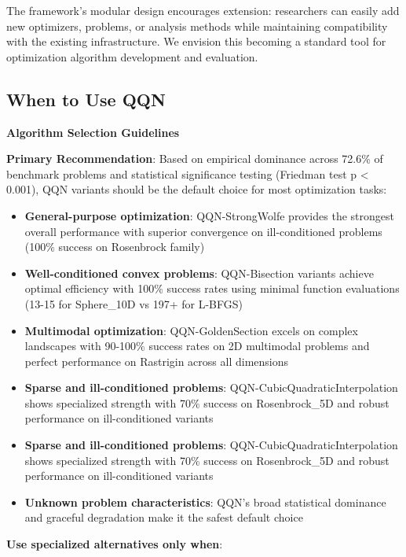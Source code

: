 The framework's modular design encourages extension: researchers can easily add new optimizers, problems, or analysis methods while maintaining compatibility with the existing infrastructure. We envision this becoming a standard tool for optimization algorithm development and evaluation.

\hypertarget{when-to-use-qqn}{%
\subsection{When to Use QQN}\label{when-to-use-qqn}}

\textbf{Algorithm Selection Guidelines}

\textbf{Primary Recommendation}: Based on empirical dominance across 72.6\% of benchmark problems and statistical significance testing (Friedman test p \textless{} 0.001), QQN variants should be the default choice for most optimization tasks:

\begin{itemize}
\tightlist
\item
  \textbf{General-purpose optimization}: QQN-StrongWolfe provides the strongest overall performance with superior convergence on ill-conditioned problems (100\% success on Rosenbrock family)
\item
  \textbf{Well-conditioned convex problems}: QQN-Bisection variants achieve optimal efficiency with 100\% success rates using minimal function evaluations (13-15 for Sphere\_10D vs 197+ for L-BFGS)
\item
  \textbf{Multimodal optimization}: QQN-GoldenSection excels on complex landscapes with 90-100\% success rates on 2D multimodal problems and perfect performance on Rastrigin across all dimensions
\item
  \textbf{Sparse and ill-conditioned problems}: QQN-CubicQuadraticInterpolation shows specialized strength with 70\% success on Rosenbrock\_5D and robust performance on ill-conditioned variants
\item
  \textbf{Sparse and ill-conditioned problems}: QQN-CubicQuadraticInterpolation shows specialized strength with 70\% success on Rosenbrock\_5D and robust performance on ill-conditioned variants
\item
  \textbf{Unknown problem characteristics}: QQN's broad statistical dominance and graceful degradation make it the safest default choice
\end{itemize}

\textbf{Use specialized alternatives only when}:

